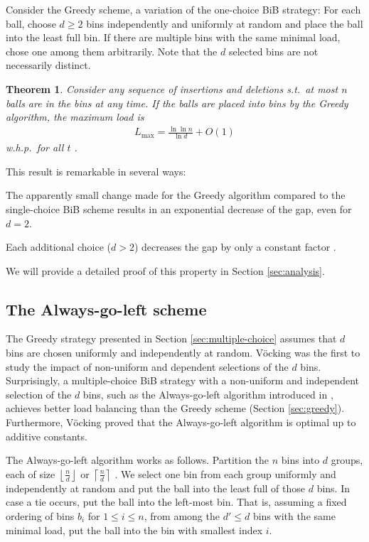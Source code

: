 \documentclass[a4paper,12pt]{article}
\newcommand\load{L_{\mathrm{max}}}
\newtheorem{theorem}{Theorem}
\begin{document}
Consider the Greedy scheme, a variation of the one-choice BiB strategy: For each ball, choose $d \geq 2$ bins independently and uniformly at random and place the ball into the least full bin. If there are multiple bins with the same minimal load, chose one among them arbitrarily. Note that the $d$ selected bins are not necessarily distinct. 

\begin{theorem}
\label{theorem:greedy}
Consider any sequence of insertions and deletions s.t.~at most $n$ balls are in the bins at any time. If the balls are placed into bins by the Greedy algorithm, the maximum load is 
\begin{align*}
\load = \frac{\ln \ln n}{\ln d}+ O(1)
\end{align*}
w.h.p.~for all $t$ \cite{ABKU99} \cite{BCSV06}.
\end{theorem}

This result is remarkable in several ways:
\begin{compactitem}
\item The apparently small change made for the Greedy algorithm compared to the single-choice BiB scheme results in an exponential decrease of the gap, even for $d=2$. 
\item Each additional choice ($d > 2$) decreases the gap by only a constant factor \cite{MRS01}.
\end{compactitem}
We will provide a detailed proof of this property in Section \ref{sec:analysis}.

\subsection{The Always-go-left scheme}
\label{sec:AlwaysGoLeft}
The Greedy strategy presented in Section \ref{sec:multiple-choice} assumes that $d$ bins are chosen uniformly and independently at random. V\"ocking \cite{VOC03} was the first to study the impact of non-uniform and dependent selections of the $d$ bins. Surprisingly, a multiple-choice BiB strategy with a non-uniform and independent selection of the $d$ bins, such as the Always-go-left algorithm introduced in \cite{VOC03}, achieves better \cite{BCSV06} load balancing than the Greedy scheme (Section \ref{sec:greedy}). Furthermore, V\"ocking proved that the Always-go-left algorithm is optimal up to additive constants.

The Always-go-left algorithm works as follows. Partition the $n$ bins into $d$ groups, each of size $\left\lfloor \frac{n}{d}\right\rfloor$ or $\left\lceil\frac{n}{d}\right\rceil$ . We select one bin from each group uniformly and independently at random and put the ball into the least full of those $d$ bins. In case a tie occurs, put the ball into the left-most bin. That is, assuming a fixed ordering of bins $b_i$ for $1 \leq i \leq n$, from among the $d' \leq d$ bins with the same minimal load, put the ball into the bin with smallest index $i$.
\end{document}

